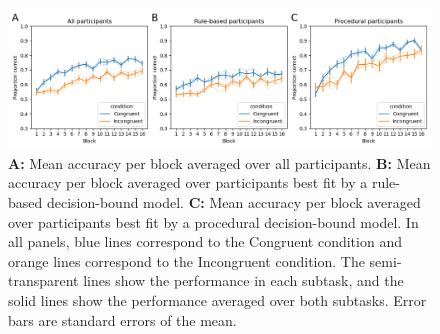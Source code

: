 \documentclass[doc, floatsintext]{apa7}
\begin{document}
\begin{figure}[h!]
    \centering
    \includegraphics[width=1\textwidth]{../figures/fig_accuracy_per_block_by_model.png}
    \caption{
        \textbf{A:} Mean accuracy per block averaged over
        all participants. \textbf{B:} Mean accuracy per block
        averaged over participants best fit by a
        rule-based decision-bound model.  \textbf{C:} Mean
        accuracy per block averaged over participants
        best fit by a procedural decision-bound model.
        In all panels, blue lines correspond to the
        Congruent condition and orange lines correspond to
        the Incongruent condition.  The semi-transparent
        lines show the performance in each subtask, and the
        solid lines show the performance averaged over both
        subtasks. Error bars are standard errors of the
        mean.
    }
    \label{fig_learning_curves}
\end{figure}
\end{document}
